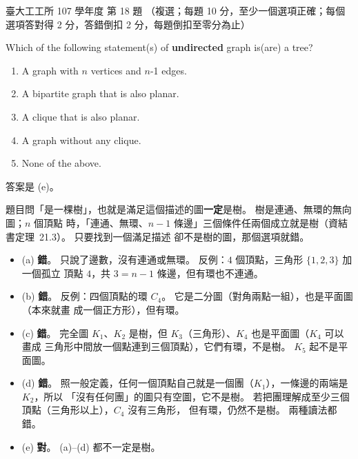 \begin{pastexam}[label={px:ntu-107-ie-ds-18}]{臺大工工所 107 學年度 第 18 題}
（複選；每題 10 分，至少一個選項正確；每個選項答對得 2 分，答錯倒扣 2 分，每題倒扣至零分為止）

Which of the following statement(s) of \textbf{undirected} graph is(are) a tree?
\begin{enumerate}[label=(\alph*),nosep]
\item A graph with $n$ vertices and $n$-1 edges.
\item A bipartite graph that is also planar.
\item A clique that is also planar.
\item A graph without any clique.
\item None of the above.
\end{enumerate}
\end{pastexam}

\begin{pastsoln}
答案是 (e)。

題目問「是一棵樹」，也就是滿足這個描述的圖\textbf{一定}是樹。 樹是連通、無環的無向圖；$n$ 個頂點
時，「連通、無環、$n - 1$ 條邊」三個條件任兩個成立就是樹（資結書定理~21.3）。 只要找到一個滿足描述
卻不是樹的圖，那個選項就錯。
\begin{itemize}
\item (a) \textbf{錯}。 只說了邊數，沒有連通或無環。 反例：$4$ 個頂點，三角形 $\{1,2,3\}$ 加一個孤立
頂點 $4$，共 $3 = n - 1$ 條邊，但有環也不連通。
\item (b) \textbf{錯}。 反例：四個頂點的環 $C_4$。 它是二分圖（對角兩點一組），也是平面圖（本來就畫
成一個正方形），但有環。
\item (c) \textbf{錯}。 完全圖 $K_1$、$K_2$ 是樹，但 $K_3$（三角形）、$K_4$ 也是平面圖（$K_4$ 可以畫成
三角形中間放一個點連到三個頂點），它們有環，不是樹。 $K_5$ 起不是平面圖。
\item (d) \textbf{錯}。 照一般定義，任何一個頂點自己就是一個團（$K_1$），一條邊的兩端是 $K_2$，所以
「沒有任何團」的圖只有空圖，它不是樹。 若把團理解成至少三個頂點（三角形以上），$C_4$ 沒有三角形，
但有環，仍然不是樹。 兩種讀法都錯。
\item (e) \textbf{對}。 (a)--(d) 都不一定是樹。
\end{itemize}
\end{pastsoln}
